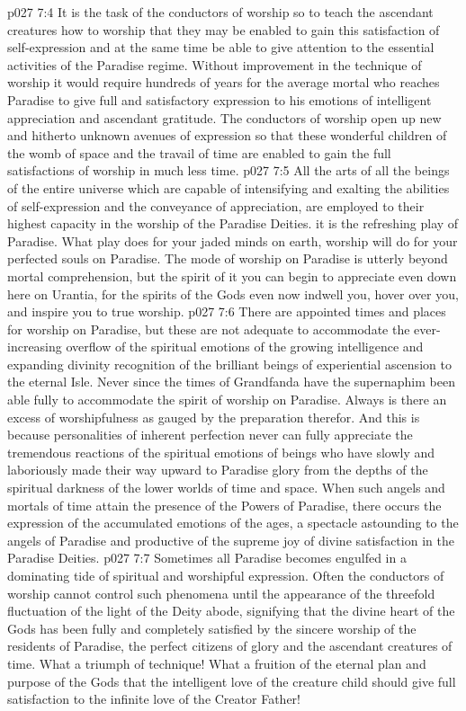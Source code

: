 \vs p027 7:4 \pc It is the task of the conductors of worship so to teach the ascendant creatures how to worship that they may be enabled to gain this satisfaction of self\hyp{}expression and at the same time be able to give attention to the essential activities of the Paradise regime. Without improvement in the technique of worship it would require hundreds of years for the average mortal who reaches Paradise to give full and satisfactory expression to his emotions of intelligent appreciation and ascendant gratitude. The conductors of worship open up new and hitherto unknown avenues of expression so that these wonderful children of the womb of space and the travail of time are enabled to gain the full satisfactions of worship in much less time.
\vs p027 7:5 All the arts of all the beings of the entire universe which are capable of intensifying and exalting the abilities of self\hyp{}expression and the conveyance of appreciation, are employed to their highest capacity in the worship of the Paradise Deities.  it is the refreshing play of Paradise. What play does for your jaded minds on earth, worship will do for your perfected souls on Paradise. The mode of worship on Paradise is utterly beyond mortal comprehension, but the spirit of it you can begin to appreciate even down here on Urantia, for the spirits of the Gods even now indwell you, hover over you, and inspire you to true worship.
\vs p027 7:6 There are appointed times and places for worship on Paradise, but these are not adequate to accommodate the ever\hyp{}increasing overflow of the spiritual emotions of the growing intelligence and expanding divinity recognition of the brilliant beings of experiential ascension to the eternal Isle. Never since the times of Grandfanda have the supernaphim been able fully to accommodate the spirit of worship on Paradise. Always is there an excess of worshipfulness as gauged by the preparation therefor. And this is because personalities of inherent perfection never can fully appreciate the tremendous reactions of the spiritual emotions of beings who have slowly and laboriously made their way upward to Paradise glory from the depths of the spiritual darkness of the lower worlds of time and space. When such angels and mortals of time attain the presence of the Powers of Paradise, there occurs the expression of the accumulated emotions of the ages, a spectacle astounding to the angels of Paradise and productive of the supreme joy of divine satisfaction in the Paradise Deities.
\vs p027 7:7 Sometimes all Paradise becomes engulfed in a dominating tide of spiritual and worshipful expression. Often the conductors of worship cannot control such phenomena until the appearance of the threefold fluctuation of the light of the Deity abode, signifying that the divine heart of the Gods has been fully and completely satisfied by the sincere worship of the residents of Paradise, the perfect citizens of glory and the ascendant creatures of time. What a triumph of technique! What a fruition of the eternal plan and purpose of the Gods that the intelligent love of the creature child should give full satisfaction to the infinite love of the Creator Father!
